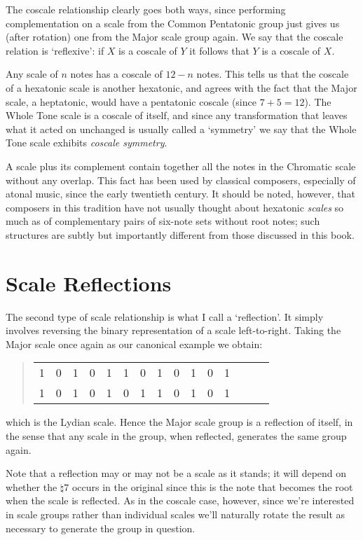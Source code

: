 \documentclass[english]{./gbook}
\begin{document}
\begin{large}
The coscale relationship clearly goes both ways, since performing complementation on a scale from the Common Pentatonic group just gives us (after rotation) one from the Major scale group again. We say that the coscale relation is `reflexive': if $X$ is a coscale of $Y$ it follows that $Y$ is a coscale of $X$.

Any scale of $n$ notes has a coscale of $12 - n$ notes. This tells us that the coscale of a hexatonic scale is another hexatonic, and agrees with the fact that the Major scale, a heptatonic, would have a pentatonic coscale (since $7 + 5 = 12$). The Whole Tone scale is a coscale of itself, and since any transformation that leaves what it acted on unchanged is usually called a `symmetry' we say that the Whole Tone scale exhibits \emph{coscale symmetry}.

A scale plus its complement contain together all the notes in the Chromatic scale without any overlap. This fact has been used by classical composers, especially of atonal music, since the early twentieth century. It should be noted, however, that composers in this tradition have not usually thought about hexatonic \emph{scales} so much as of complementary pairs of six-note sets without root notes; such structures are subtly but importantly different from those discussed in this book.

\section{Scale Reflections}

The second type of scale relationship is what I call a `reflection'. It simply involves reversing the binary representation of a scale left-to-right. Taking the Major scale once again as our canonical example we obtain:
\begin{quote}
\begin{tabular}{rrrrrrrrrrrrrrr}
	1 & 0 &1 & 0 &1 & 1 & 0 & 1 & 0 & 1 & 0 & 1 \\
	1 & 0 &1 & 0 &1 & 0 & 1 & 1 & 0 & 1 & 0 & 1 \\
\end{tabular}
\end{quote}
which is the Lydian scale. Hence the Major scale group is a reflection of itself, in the sense that any scale in the group, when reflected, generates the same group again.

Note that a reflection may or may not be a scale as it stands; it will depend on whether the $\natural7$ occurs in the original since this is the note that becomes the root when the scale is reflected. As in the coscale case, however, since we're interested in scale groups rather than individual scales we'll naturally rotate the result as necessary to generate the group in question.


\end{large}
\end{document}
